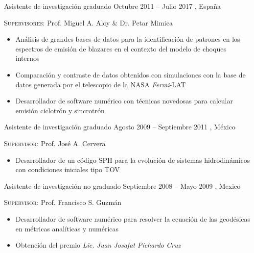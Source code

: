 \cventry{}%
{\DAAval}%
{Asistente de investigación graduado}%
{Octubre 2011 -- Julio 2017}%
{\UVval, España}%
{\textsc{Supervisores}: Prof. Miguel A. Aloy \& Dr. Petar Mimica
  \begin{itemize}
    \item Análisis de grandes bases de datos para la identificación de patrones en los espectros de emisión de blazares en el contexto del modelo de choques internos
    \item Comparación y contraste de datos obtenidos con simulaciones con la base de datos generada por el telescopio de la NASA \emph{Fermi}-LAT \cite{RuedaBecerril:2014mi}
    \item Desarrollador de software numérico con técnicas novedosas para calcular emisión ciclotrón y sincrotrón \cite{RuedaBecerril:2017mi}
  \end{itemize}
}
\cventry{}%
{\IFMes}%
{Asistente de investigación graduado}%
{\hspace{-30ex}Agosto 2009 -- Septiembre 2011}%
{\UMSNHes, México}%
{\textsc{Supervisor}: Prof. José A. Cervera
  \begin{itemize}
    \item Desarrollador de un código SPH para la evolución de sistemas hidrodinámicos con condiciones iniciales tipo TOV
  \end{itemize}
}
\cventry{}%
{\FCes}%
{Asistente de investigación no graduado}%
{Septiembre 2008 -- Mayo 2009}%
{\UAEMes, Mexico}%
{\textsc{Supervisor}: Prof. Francisco S. Guzmán
  \begin{itemize}
    \item Desarrollador de software numérico para resolver la ecuación de las geodésicas en métricas analíticas y numéricas \cite{Guzman:2009ru}
    \item Obtención del premio \emph{Lic. Juan Josafat Pichardo Cruz}
  \end{itemize}
}
